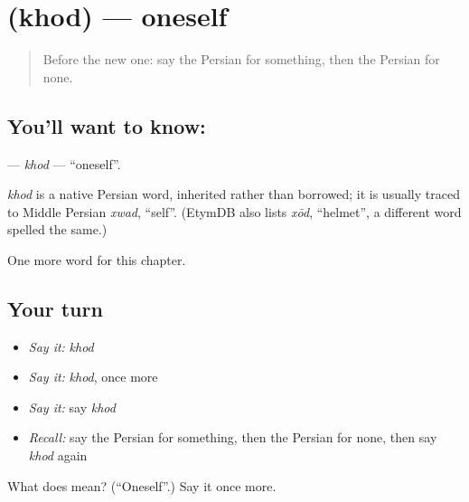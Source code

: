 \section[\texorpdfstring{\fa{خود} (khod)}{خود (khod)}]{ (khod) — oneself}

\label{lesson:FA-C84-khod}



\begin{quote}
Before the new one: say the Persian for something, then the Persian for none.
\end{quote}

\subsection*{You'll want to know: }
\textbf{} — \emph{khod} — \textquotedblleft{}oneself\textquotedblright{}.

\begin{cousinweb}
\emph{khod} is a native Persian word, inherited rather than borrowed; it is usually traced to Middle Persian \emph{xwad}, \textquotedblleft{}self\textquotedblright{}. (EtymDB also lists \emph{xōd}, \textquotedblleft{}helmet\textquotedblright{}, a different word spelled the same.)
\end{cousinweb}

\begin{grammarlens}[title={What you've built}]
One more word for this chapter.
\end{grammarlens}

\subsection*{Your turn}
\begin{itemize}
\raggedright
  \item \emph{Say it:} \emph{khod}
  \item \emph{Say it:} \emph{khod}, once more
  \item \emph{Say it:} say \emph{khod}
  \item \emph{Recall:} say the Persian for something, then the Persian for none, then say \emph{khod} again
\end{itemize}

\begin{tcolorbox}[breakable,colback=teal!4,colframe=teal!35!black,title={Before you move on}]
What does  mean? (\textquotedblleft{}Oneself\textquotedblright{}.) Say it once more.
\end{tcolorbox}
